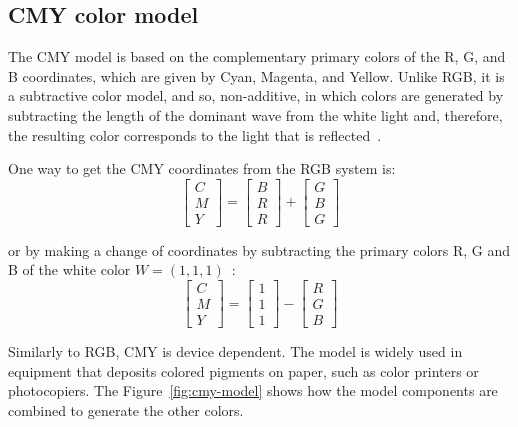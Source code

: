 \subsection{CMY color model}
\label{sec:modelo_cores_cmy}

The CMY model is based on the complementary primary colors of the R, G, and B coordinates, which are given by Cyan, Magenta, and Yellow. Unlike RGB, it is a subtractive color model, and so, non-additive, in which colors are generated by subtracting the length of the dominant wave from the white light and, therefore, the resulting color corresponds to the light that is reflected~\citep{gonzalez:02}.

One way to get the CMY coordinates from the RGB system is:\\
\begin{equation}
  \begin{bmatrix}
    C \\ M \\ Y
  \end{bmatrix} = 
  \begin{bmatrix}
    B \\ R \\ R
  \end{bmatrix} +
  \begin{bmatrix}
    G \\ B \\ G
  \end{bmatrix}
\end{equation}

\noindent or by making a change of coordinates by subtracting the primary colors R, G and B of the white color $W = (1, 1, 1)$~\citep{gonzalez:02}:
\begin{equation}
  \begin{bmatrix}
    C \\ M \\ Y
  \end{bmatrix} = 
  \begin{bmatrix}
    1 \\ 1 \\ 1
  \end{bmatrix} -
  \begin{bmatrix}
    R \\ G \\ B
  \end{bmatrix}
\end{equation}

Similarly to RGB, CMY is device dependent. The model is widely used in equipment that deposits colored pigments on paper, such as color printers or photocopiers. The Figure~\ref{fig:cmy-model} shows how the model components are combined to generate the other colors.

